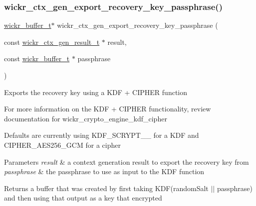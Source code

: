 \subsubsection{\texorpdfstring{wickr\+\_\+ctx\+\_\+gen\+\_\+export\+\_\+recovery\+\_\+key\+\_\+passphrase()}{wickr\_ctx\_gen\_export\_recovery\_key\_passphrase()}}
{\footnotesize\ttfamily \mbox{\hyperlink{structwickr__buffer}{wickr\+\_\+buffer\+\_\+t}}$\ast$ wickr\+\_\+ctx\+\_\+gen\+\_\+export\+\_\+recovery\+\_\+key\+\_\+passphrase (\begin{DoxyParamCaption}\item[{const \mbox{\hyperlink{structwickr__ctx__gen__result}{wickr\+\_\+ctx\+\_\+gen\+\_\+result\+\_\+t}} $\ast$}]{result,  }\item[{const \mbox{\hyperlink{structwickr__buffer}{wickr\+\_\+buffer\+\_\+t}} $\ast$}]{passphrase }\end{DoxyParamCaption})}

Exports the recovery key using a K\+DF + C\+I\+P\+H\+ER function

For more information on the K\+DF + C\+I\+P\+H\+ER functionality, review documentation for \textquotesingle{}wickr\+\_\+crypto\+\_\+engine\+\_\+kdf\+\_\+cipher\textquotesingle{}

Defaults are currently using K\+D\+F\+\_\+\+S\+C\+R\+Y\+P\+T\+\_\+\_ for a K\+DF and C\+I\+P\+H\+E\+R\+\_\+\+A\+E\+S256\+\_\+\+G\+CM for a cipher


\begin{DoxyParams}{Parameters}
{\em result} & a context generation result to export the recovery key from \\
\hline
{\em passphrase} & the passphrase to use as input to the K\+DF function \\
\hline
\end{DoxyParams}
\begin{DoxyReturn}{Returns}
a buffer that was created by first taking K\+DF(random\+Salt $\vert$$\vert$ passphrase) and then using that output as a key that encrypted 
\end{DoxyReturn}
\mbox{\label{group__wickr__ctx_ga0bde95494141673604b9e4e1f7954e2c}} 
